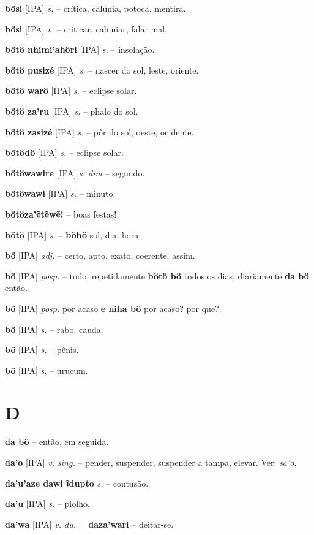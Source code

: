 \textbf{bösi} [IPA] \textit{s.} -- crítica, calúnia, potoca, mentira.

\textbf{bösi} [IPA] \textit{v.} -- criticar, caluniar, falar mal.

\textbf{bötö nhimi'ahöri} [IPA] \textit{s.} -- insolação.

\textbf{bötö pusizé} [IPA] \textit{s.} -- nascer do sol, leste, oriente.

\textbf{bötö warö} [IPA] \textit{s.} -- eclipse solar.

\textbf{bötö za'ru} [IPA] \textit{s.} -- phalo do sol.

\textbf{bötö zasizé} [IPA] \textit{s.} -- pôr do sol, oeste, ocidente.

\textbf{bötödö} [IPA] \textit{s.} -- eclipse solar.

\textbf{bötöwawire} [IPA] \textit{s. dim} -- segundo.

\textbf{bötöwawi} [IPA] \textit{s.} -- minuto.

\textbf{bötöza'ẽtẽwẽ!} -- boas festas!

\textbf{bötö} [IPA] \textit{s.} -- \textbf{böbö} sol, dia, hora.

\textbf{bö} [IPA] \textit{adj.} -- certo, apto, exato, coerente, assim.

\textbf{bö} [IPA] \textit{posp.} -- todo, repetidamente  \textbf{bötö bö} todos os dias, diariamente  \textbf{da bö} então.

\textbf{bö} [IPA] \textit{posp.} por acaso  \textbf{e niha bö} por acaso? por que?.

\textbf{bö} [IPA] \textit{s.} -- rabo, cauda.

\textbf{bö} [IPA] \textit{s.} -- pênis.

\textbf{bö} [IPA] \textit{s.} -- urucum.


\section*{D}


\textbf{da bö} -- então, em seguida.

\textbf{da'o} [IPA] \textit{v. sing.} -- pender, suspender, suspender a tampa, elevar. Ver: \textit{sa'o}.

\textbf{da'u'aze dawi ĩdupto} \textit{s.} -- contusão.

\textbf{da'u} [IPA] \textit{s.} -- piolho.

\textbf{da'wa} [IPA] \textit{v. du.} = \textbf{daza'wari} -- deitar-se.

